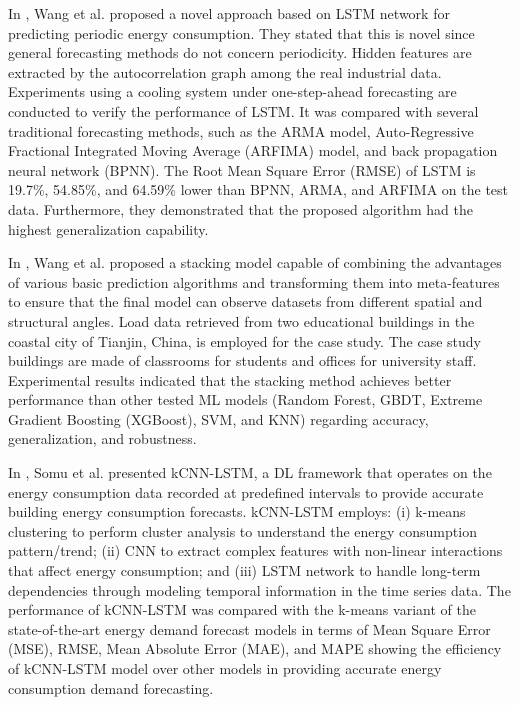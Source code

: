 In \cite{WANG2020117197}, Wang et al. proposed a novel approach based on LSTM network for predicting periodic energy consumption.
They stated that this is novel since general forecasting methods do not concern periodicity.
Hidden features are extracted by the autocorrelation graph among the real industrial data.
Experiments using a cooling system under one-step-ahead forecasting are conducted to verify the performance of LSTM.
It was compared with several traditional forecasting methods, such as the ARMA model, Auto-Regressive Fractional Integrated Moving Average (ARFIMA) model, and back propagation neural network (BPNN).
The Root Mean Square Error (RMSE) of LSTM is 19.7\%, 54.85\%, and 64.59\% lower than BPNN, ARMA, and ARFIMA on the test data.
Furthermore, they demonstrated that the proposed algorithm had the highest generalization capability.

In \cite{WANG2020114561}, Wang et al. proposed a stacking model capable of combining the advantages of various basic prediction algorithms and transforming them into meta-features to ensure that the final model can observe datasets from different spatial and structural angles.
Load data retrieved from two educational buildings in the coastal city of Tianjin, China, is employed for the case study.
The case study buildings are made of classrooms for students and offices for university staff.
Experimental results indicated that the stacking method achieves better performance than other tested ML models (Random Forest, GBDT, Extreme Gradient Boosting (XGBoost), SVM, and KNN) regarding accuracy, generalization, and robustness.

In \cite{SOMU2021110591}, Somu et al. presented kCNN-LSTM, a DL framework that operates on the energy consumption data recorded at predefined intervals to provide accurate building energy consumption forecasts.
kCNN-LSTM employs:
(i) k-means clustering to perform cluster analysis to understand the energy consumption pattern\slash trend;
(ii) CNN to extract complex features with non-linear interactions that affect energy consumption;
and (iii) LSTM network to handle long-term dependencies through modeling temporal information in the time series data.
The performance of kCNN-LSTM was compared with the k-means variant of the state-of-the-art energy demand forecast models in terms of Mean Square Error (MSE), RMSE, Mean Absolute Error (MAE), and MAPE showing the efficiency of kCNN-LSTM model over other models in providing accurate energy consumption demand forecasting.

